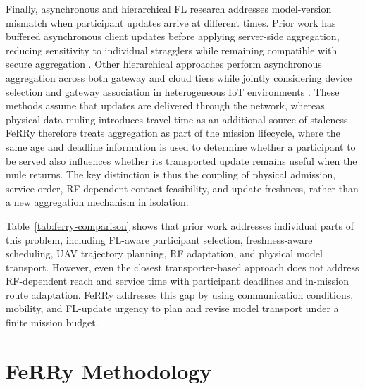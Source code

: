 \documentclass[conference]{IEEEtran}
\newcommand{\sysname}{FeRRy}
\begin{document}
Finally, asynchronous and hierarchical FL research addresses model-version mismatch when participant updates arrive at different times. Prior work has buffered asynchronous client updates before applying server-side aggregation, reducing sensitivity to individual stragglers while remaining compatible with secure aggregation \cite{nguyen2022federated}. Other hierarchical approaches perform asynchronous aggregation across both gateway and cloud tiers while jointly considering device selection and gateway association in heterogeneous IoT environments \cite{yu2023async}. These methods assume that updates are delivered through the network, whereas physical data muling introduces travel time as an additional source of staleness. FeRRy therefore treats aggregation as part of the mission lifecycle, where the same age and deadline information is used to determine whether a participant to be served also influences whether its transported update remains useful when the mule returns. The key distinction is thus the coupling of physical admission, service order, RF-dependent contact feasibility, and update freshness, rather than a new aggregation mechanism in isolation.

Table~\ref{tab:ferry-comparison} shows that prior work addresses individual parts of this problem, including FL-aware participant selection, freshness-aware scheduling, UAV trajectory planning, RF adaptation, and physical model transport. However, even the closest transporter-based approach does not address RF-dependent reach and service time with participant deadlines and in-mission route adaptation. FeRRy addresses this gap by using communication conditions, mobility, and FL-update urgency to plan and revise model transport under a finite mission budget.

\section{\sysname{} Methodology}
\label{sec:method}


\end{document}
